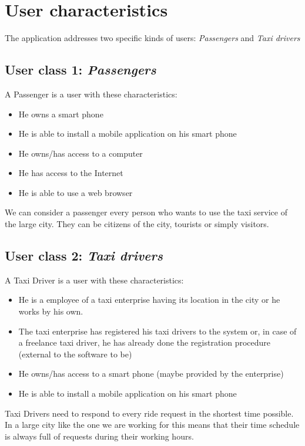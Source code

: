 \section{User characteristics}
The application addresses two specific kinds of users: \textit{Passengers} and \textit{Taxi drivers}
\subsection{User class 1: \textit{Passengers}}
A Passenger is a user with these characteristics:
\begin{itemize}
\item He owns a smart phone
\item He is able to install a mobile application on his smart phone
\item He owns/has access to a computer
\item He has access to the Internet
\item He is able to use a web browser
\end{itemize}
We can consider a passenger every person who wants to use the taxi service of the large city. They can be citizens of the city, tourists or simply visitors.
\subsection{User class 2: \textit{Taxi drivers}}
A Taxi Driver is a user with these characteristics:
\begin{itemize}
\item He is a employee of a taxi enterprise having its location in the city or he works by his own.
\item The taxi enterprise has registered his taxi drivers to the system or, in case of a freelance taxi driver, he has already done the registration procedure (external to the software to be)
\item He owns/has access to a smart phone (maybe provided by the enterprise)
\item He is able to install a mobile application on his smart phone
\end{itemize}
Taxi Drivers need to respond to every ride request in the shortest time possible. In a large city like the one we are working for this means that their time schedule is always full of requests during their working hours.